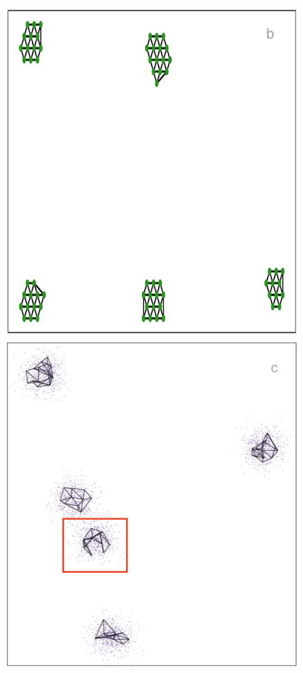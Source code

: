\documentclass[
  12pt]{article}
\begin{document}
\begin{figure}[H]
\begin{minipage}{0.33\linewidth}
\includegraphics{figures/five_gau_clusters/2d_model_umap.png}\end{minipage}%
%
\begin{minipage}{0.33\linewidth}
\includegraphics{figures/five_gau_clusters/sc_umap_3.png}\end{minipage}%


\end{figure}
\end{document}
